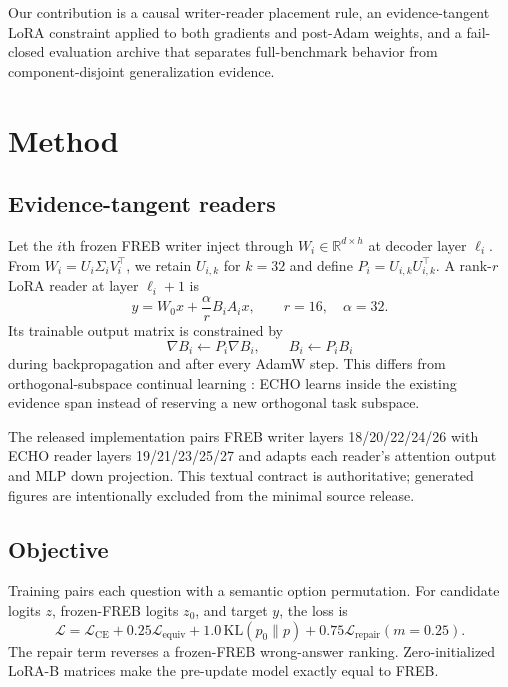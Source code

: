 \documentclass[10pt]{article}
\begin{document}
Our contribution is a causal writer-reader placement rule, an evidence-tangent
LoRA constraint applied to both gradients and post-Adam weights, and a
fail-closed evaluation archive that separates full-benchmark behavior from
component-disjoint generalization evidence.

\section{Method}
\subsection{Evidence-tangent readers}
Let the $i$th frozen FREB writer inject through
$W_i\in\mathbb{R}^{d\times h}$ at decoder layer $\ell_i$. From
$W_i=U_i\Sigma_iV_i^\top$, we retain $U_{i,k}$ for $k=32$ and define
$P_i=U_{i,k}U_{i,k}^\top$. A rank-$r$ LoRA reader at layer $\ell_i+1$ is
\begin{equation}
 y=W_0x+\frac{\alpha}{r}B_iA_ix,\qquad r=16,\quad\alpha=32.
\end{equation}
Its trainable output matrix is constrained by
\begin{equation}
 \nabla B_i\leftarrow P_i\nabla B_i,\qquad
 B_i\leftarrow P_iB_i
\end{equation}
during backpropagation and after every AdamW step. This differs from
orthogonal-subspace continual learning \cite{wang2023olora}: ECHO learns
inside the existing evidence span instead of reserving a new orthogonal task
subspace.

The released implementation pairs FREB writer layers 18/20/22/24/26 with
ECHO reader layers 19/21/23/25/27 and adapts each reader's attention output and
MLP down projection. This textual contract is authoritative; generated figures
are intentionally excluded from the minimal source release.

\subsection{Objective}
Training pairs each question with a semantic option permutation. For candidate
logits $z$, frozen-FREB logits $z_0$, and target $y$, the loss is
\begin{equation}
\mathcal{L}=\mathcal{L}_{\mathrm{CE}}+0.25\mathcal{L}_{\mathrm{equiv}}
+1.0\,\mathrm{KL}(p_0\|p)+0.75\mathcal{L}_{\mathrm{repair}}(m=0.25).
\end{equation}
The repair term reverses a frozen-FREB wrong-answer ranking. Zero-initialized
LoRA-B matrices make the pre-update model exactly equal to FREB.
\end{document}
